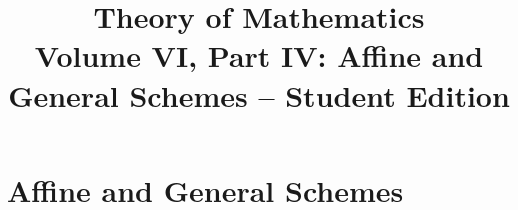 \documentclass[11pt,a4paper,oneside,openany]{book}
\title{Theory of Mathematics\\[0.5em]\Large Volume VI, Part IV: Affine and General Schemes -- Student Edition}
\author{}\date{}
\begin{document}
\maketitle\clearpage
\frontmatter\tableofcontents\mainmatter
\part{Affine and General Schemes}
\setcounter{chapter}{17}

\end{document}
